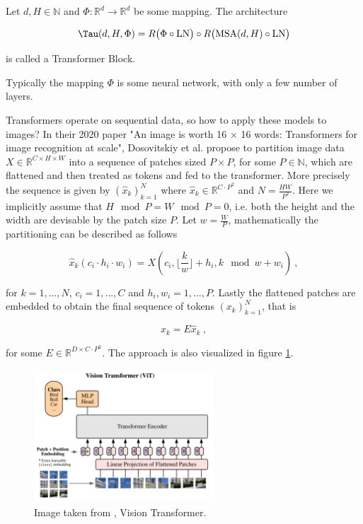 \begin{definition} 
    \label{def:transformer_block}
    Let $d, H \in \mathbb N$ and $\Phi: \mathbb{R}^d \to \mathbb{R}^d$ be some mapping.
    The architecture 

        \begin{equation*}
            \Tau(d, H, \Phi) = R \big( \Phi \circ \text{LN} \big) \circ R \big( \text{MSA}(d, H) \circ \text{LN} \big)
        \end{equation*}

    is called a Transformer Block.
\end{definition}

Typically the mapping $\Phi$ is some neural network, with only a few number of layers.

Transformers operate on sequential data, 
so how to apply these models to images?
In their 2020 paper "An image is worth 16 $\times$ 16 words: Transformers for image recognition at scale",
Dosovitskiy et al. \cite{dosovitskiyImageWorth16x162021} propose to partition image data $X \in \mathbb R^{C \times H \times W}$
into a sequence of patches sized $P \times P$, for some $P \in \mathbb N$, 
which are flattened and then treated as tokens and fed to the transformer. 
More precisely the sequence is given by $(\hat{x}_k)_{k=1}^N$ where $\hat{x}_k \in \mathbb R^{C \cdot P^2}$ and $N = \frac{HW}{P^2}$.
Here we implicitly assume that $H \mod P = W \mod P = 0$, i.e. both the height and the width are devisable by the patch size $P$.
Let $w = \frac{W}{P}$, mathematically the partitioning can be described as follows 

    \begin{equation} \label{eq:vit_patch}
        \hat{x}_{k}(c_i \cdot h_i \cdot w_i) = X \left( c_i, \lfloor \frac{k}{w} \rfloor + h_i, k \mod w + w_i \right) ~,
    \end{equation}

for $k = 1, ..., N$, $c_i = 1, ..., C$ and $h_i, w_i = 1, ..., P$.
Lastly the flattened patches are embedded to obtain the final sequence of tokens $(x_k)_{k=1}^N$,
that is

    $$ x_k = E \hat{x}_k ~, $$

for some $E \in \mathbb R^{D \times C \cdot P^2}$.
The approach is also visualized in figure \ref{fig:vit}.

\begin{figure}[h!]
    \includegraphics[width=0.6\textwidth]{models/preliminaries/imgs/vit.png}
    \caption{Image taken from \cite{dosovitskiyImageWorth16x162021}, Vision Transformer.}
    \label{fig:vit}
\end{figure}

